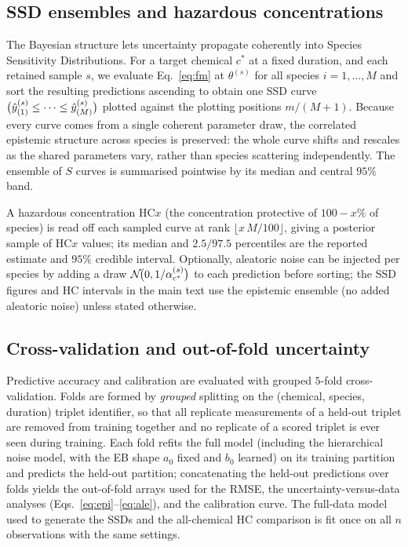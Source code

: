\subsection{SSD ensembles and hazardous concentrations}
\label{sec:ssd}

The Bayesian structure lets uncertainty propagate coherently into Species
Sensitivity Distributions. For a target chemical $c^\ast$ at a fixed duration,
and each retained sample $s$, we evaluate Eq.~\eqref{eq:fm} at $\theta^{(s)}$ for
all species $i=1,\dots,M$ and sort the resulting predictions ascending to obtain
one SSD curve $\big(\hat{y}^{(s)}_{(1)}\le\cdots\le\hat{y}^{(s)}_{(M)}\big)$ plotted
against the plotting positions $m/(M+1)$. Because every curve comes from a single
coherent parameter draw, the correlated epistemic structure across species is
preserved: the whole curve shifts and rescales as the shared parameters vary,
rather than species scattering independently. The ensemble of $S$ curves is
summarised pointwise by its median and central $95\%$ band.

A hazardous concentration $\mathrm{HC}x$ (the concentration protective of
$100-x\%$ of species) is read off each sampled curve at rank
$\lfloor x\,M/100\rfloor$, giving a posterior sample of $\mathrm{HC}x$ values;
its median and $2.5/97.5$ percentiles are the reported estimate and $95\%$
credible interval. Optionally, aleatoric noise can be injected per species by
adding a draw $\mathcal{N}\!\big(0,1/\alpha_{c^\ast}^{(s)}\big)$ to each prediction
before sorting; the SSD figures and HC intervals in the main text use the
epistemic ensemble (no added aleatoric noise) unless stated otherwise.

\subsection{Cross-validation and out-of-fold uncertainty}
\label{sec:cv}

Predictive accuracy and calibration are evaluated with grouped $5$-fold
cross-validation. Folds are formed by \emph{grouped} splitting on the
(chemical, species, duration) triplet identifier, so that all replicate
measurements of a held-out triplet are removed from training together and no
replicate of a scored triplet is ever seen during training. Each fold refits the
full model (including the hierarchical noise model, with the EB shape $a_0$ fixed
and $b_0$ learned) on its training partition and predicts the held-out partition;
concatenating the held-out predictions over folds yields the out-of-fold arrays
used for the RMSE, the uncertainty-versus-data analyses
(Eqs.~\ref{eq:epi}--\ref{eq:ale}), and the calibration curve. The full-data model
used to generate the SSDs and the all-chemical HC comparison is fit once on all
$n$ observations with the same settings.

